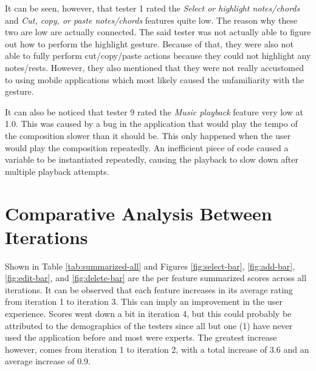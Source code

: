 			It can be seen, however, that tester 1 rated the \textit{Select or highlight notes/chords} and \textit{Cut, copy, or paste notes/chords} features quite low. The reason why these two are low are actually connected. The said tester was not actually able to figure out how to perform the highlight gesture. Because of that, they were also not able to fully perform cut/copy/paste actions because they could not highlight any notes/rests. However, they also mentioned that they were not really accustomed to using mobile applications which most likely caused the unfamiliarity with the gesture. 

			It can also be noticed that tester 9 rated the \textit{Music playback} feature very low at 1.0. This was caused by a bug in the application that would play the tempo of the composition slower than it should be. This only happened when the user would play the composition repeatedly. An inefficient piece of code caused a variable to be instantiated repeatedly, causing the playback to slow down after multiple playback attempts. 
		

	\section{Comparative Analysis Between Iterations} %
	\label{sec:comparative_analysis}

		Shown in Table \ref{tab:summarized-all} and Figures \ref{fig:select-bar}, \ref{fig:add-bar}, \ref{fig:edit-bar}, and \ref{fig:delete-bar} are the per feature summarized scores across all iterations. It can be observed that each feature increases in its average rating from iteration 1 to iteration 3. This can imply an improvement in the user experience. Scores went down a bit in iteration 4, but this could probably be attributed to the demographics of the testers since all but one (1) have never used the application before and most were experts. The greatest increase however, comes from iteration 1 to iteration 2, with a total increase of 3.6 and an average increase of 0.9. 

